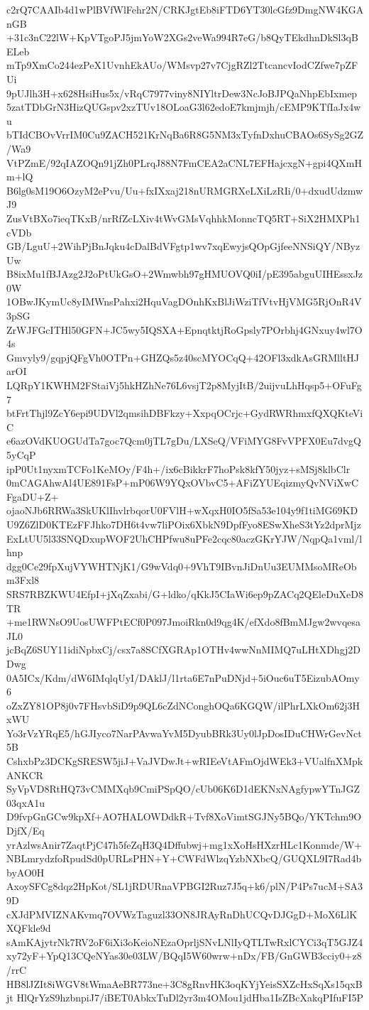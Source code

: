 c2rQ7CAAIb4d1wPlBVfWlFehr2N/CRKJgtEb8iFTD6YT30lcGfz9DmgNW4KGAnGB
+31c3nC22lW+KpVTgoPJ5jmYoW2XGs2veWa994R7eG/b8QyTEkdhnDkSl3qBELeb
mTp9XmCo244ezPeX1UvnhEkAUo/WMsvp27v7CjgRZl2TtcancvIodCZfwe7pZFUi
9pUJlh3H+x628HsiHus5x/vRqC7977viny8NIYltrDew3NcJoBJPQaNhpEbIxmep
5zatTDbGrN3HizQUGspv2xzTUv18OLoaG3l62edoE7kmjmjh/cEMP9KTfIaJx4wu
bTIdCBOvVrrIM0Cu9ZACH521KrNqBa6R8G5NM3xTyfnDxhuCBAOs6SySg2GZ/Wa9
VtPZmE/92qIAZOQn91jZh0PLrqJ88N7FmCEA2aCNL7EFHajcxgN+gpi4QXmHm+lQ
B6lg0sM19O6OzyM2ePvu/Uu+fxIXxaj218nURMGRXeLXiLzRIi/0+dxudUdzmwJ9
ZusVtBXo7ieqTKxB/nrRfZcLXiv4tWvGMsVqhhkMonncTQ5RT+SiX2HMXPh1cVDb
GB/LguU+2WihPjBnJqku4cDalBdVFgtp1wv7xqEwyjsQOpGjfeeNNSiQY/NByzUw
B8ixMu1fBJAzg2J2oPtUkGsO+2Wmwbh97gHMUOVQ0iI/pE395abguUIHEssxJz0W
1OBwJKymUc8yIMWnsPahxi2HquVagDOnhKxBlJiWziTfVtvHjVMG5RjOnR4V3pSG
ZrWJFGcITHl50GFN+JC5wy5IQSXA+EpnqtktjRoGpsly7POrbhj4GNxuy4wl7O4s
Gmvyly9/gqpjQFgVh0OTPn+GHZQs5z40scMYOCqQ+42OFl3xdkAsGRMlltHJarOI
LQRpY1KWHM2FStaiVj5hkHZhNe76L6vsjT2p8MyjItB/2uijvuLhHqsp5+OFuFg7
btFrtThjl9ZcY6epi9UDVl2qmsihDBFkzy+XxpqOCrjc+GydRWRhmxfQXQKteViC
e6azOVdKUOGUdTa7goc7Qcm0jTL7gDu/LXSeQ/VFiMYG8FvVPFX0Eu7dvgQ5yCqP
ipP0Ut1nyxmTCFo1KeMOy/F4h+/ix6cBikkrF7hoPsk8kfY50jyz+sMSj8klbClr
0mCAGAhwAl4UE891FsP+mP06W9YQxOVbvC5+AFiZYUEqizmyQvNViXwCFgaDU+Z+
ojaoNJb6RRWa3SkUKlIhvlrbqorU0FVlH+wXqxH0IO5fSa53e104y9f1tiMG69KD
U9Z6ZlD0KTEzFFJhko7DH6t4vw7liPOix6XbkN9DpfFyo8ESwXheS3tYz2dprMjz
ExLtUU5l33SNQDxupWOF2UhCHPfwu8uPFe2cqc80aczGKrYJW/NqpQa1vml/lhnp
dgg0Ce29fpXujVYWHTNjK1/G9wVdq0+9VhT9IBvnJiDnUu3EUMMsoMReObm3Fxl8
SRS7RBZKWU4EfpI+jXqZxabi/G+ldko/qKkJ5CIaWi6ep9pZACq2QEleDuXeD8TR
+me1RWNsO9UosUWFPtECf0P097JmoiRkn0d9qg4K/efXdo8fBmMJgw2wvqesaJL0
jcBqZ6SUY11idiNpbxCj/csx7a8SCfXGRAp1OTHv4wwNnMIMQ7uLHtXDhgj2DDwg
0A5ICx/Kdm/dW6IMqlqUyI/DAklJ/l1rta6E7nPuDNjd+5iOuc6uT5EizubAOmy6
oZxZY81OP8j0v7FHsvbSiD9p9QL6cZdNConghOQa6KGQW/ilPhrLXkOm62j3HxWU
Yo3rVzYRqE5/hGJIyco7NarPAvwaYvM5DyubBRk3Uy0lJpDosIDuCHWrGevNct5B
CshxbPz3DCKgSRESW5jiJ+VaJVDwJt+wRIEeVtAFmOjdWEk3+VUalfnXMpkANKCR
SyVpVD8RtHQ73vCMMXqb9CmiPSpQO/cUb06K6D1dEKNxNAgfypwYTnJGZ03qxA1u
D9fvpGnGCw9kpXf+AO7HALOWDdkR+Tvf8XoVimtSGJNy5BQo/YKTchm9ODjfX/Eq
yrAzlwsAnir7ZaqtPjC47h5feZqH3Q4Dffubwj+mg1xXoHsHXzrHLc1Konmde/W+
NBLmrydzfoRpudSd0pURLsPHN+Y+CWFdWlzqYzbNXbcQ/GUQXL9I7Rad4bbyAO0H
AxoySFCg8dqz2HpKot/SL1jRDURnaVPBGI2Ruz7J5q+k6/plN/P4Ps7ucM+SA39D
cXJdPMVIZNAKvmq7OVWzTaguzl33ON8JRAyRnDhUCQvDJGgD+MoX6LlKXQFkle9d
sAmKAjytrNk7RV2oF6iXi3oKeioNEzaOprljSNvLNlIyQTLTwRxlCYCi3qT5GJZ4
xy72yF+YpQ13CQeNYas30e03LW/BQqI5W60wrw+nDx/FB/GnGWB3cciy0+z8/rrC
HB8lJZIt8iWGV8tWmaAeBR773ne+3C8gRnvHK3oqKYjYeisSXZcHxSqXs15qxBjt
HlQrYzS9hzbnpiJ7/iBET0AbkxTuDl2yr3m4OMou1jdHba1IsZBcXakqPIfuFI5P

